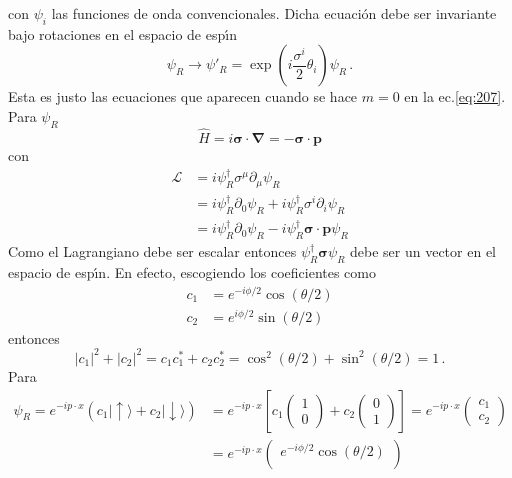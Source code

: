 \begin{subappendices}
\begin{equation}
\end{equation}
con $\psi_i$ las funciones de onda convencionales. Dicha ecuaci\'on debe ser invariante bajo rotaciones en el espacio de esp\'\i n
\begin{equation}
  \psi_R\to\psi'_R=\exp(i\frac{\sigma^i}{2}\theta_i)\psi_R\,.
\end{equation}
Esta es justo las ecuaciones que aparecen cuando se hace $m=0$ en la ec.\eqref{eq:207}. Para $\psi_R$
\begin{equation}
  \widehat{H}=i\boldsymbol{\sigma}\cdot\boldsymbol{\nabla}=-\boldsymbol{\sigma}\cdot\mathbf{p}
\end{equation}
con
\begin{align}
\label{eq:208}
\mathcal{L}&= i\psi_R^\dagger {\sigma}^\mu\partial_\mu\psi_R  \nonumber\\
&=i\psi_R^\dagger \partial_0\psi_R+i\psi_R^\dagger {\sigma}^i\partial_i\psi_R\nonumber\\
&=i\psi_R^\dagger \partial_0\psi_R-i\psi_R^\dagger\boldsymbol{\sigma}\cdot\mathbf{p} \psi_R
\end{align}
Como el Lagrangiano debe ser escalar entonces $\psi_R^\dagger\boldsymbol{\sigma} \psi_R$ debe ser un vector en el espacio de esp\'\i n. En efecto, escogiendo los coeficientes como
\begin{align}
  c_1&=e^{-i \phi/2}\cos(\theta/2)\nonumber\\
  c_2&=e^{i \phi/2}\sin(\theta/2)
\end{align}
entonces
\begin{equation}
  |c_1|^2+|c_2|^2=c_1 c_1^*+c_2 c_2^*=\cos^2(\theta/2)+\sin^2(\theta/2)=1\,.
\end{equation}
Para
\begin{align}
  \psi_R=e^{-i p\cdot x}(c_1|\uparrow\rangle+c_2|\downarrow\rangle)&=e^{-i p\cdot x}\left[c_1\begin{pmatrix}
    1\\
    0
  \end{pmatrix}+c_2
  \begin{pmatrix}
    0\\
    1
  \end{pmatrix}\right]=
  e^{-i p\cdot x}\begin{pmatrix}
    c_1\\
    c_2
  \end{pmatrix}\,\nonumber\\
  &=e^{-i p\cdot x}
  \begin{pmatrix}
  e^{-i \phi/2}\cos(\theta/2)\\

\end{pmatrix}
\end{align}
\end{subappendices}
